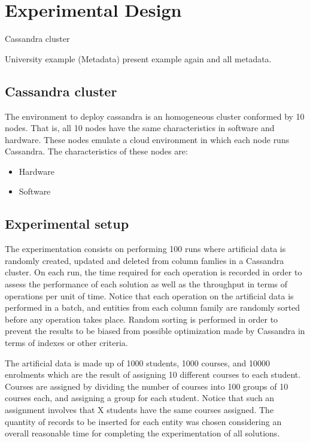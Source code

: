\chapter{Experimental Design}
Cassandra cluster

University example (Metadata) present example again and all metadata.

\section{Cassandra cluster}

The environment to deploy cassandra is  an homogeneous cluster conformed by 10
nodes. That is, all 10 nodes have the same characteristics in software and
hardware. These nodes emulate a cloud environment in which each node runs
Cassandra. The characteristics of these nodes are:

\begin{itemize}
  \item Hardware
  \item Software
\end{itemize}




\section{Experimental setup}\label{s:exp:setup}
The experimentation consists on performing 100 runs where artificial data is
randomly created, updated and deleted from column famlies in a Cassandra
cluster.
On each run, the time required for each operation is recorded in order to assess the
performance of each solution as well as the throughput in terms of operations
per unit of time. Notice that each operation on the artificial data  is
performed in a batch, and entities from each column family are randomly sorted
before any operation takes place. Random sorting is performed in order to
prevent the results to be biased from possible optimization made by Cassandra in
terms of indexes or other criteria.
		
The artificial data is made up of 1000 students, 1000 courses, and 10000
enrolments which are the result of assigning 10 different courses to each
student. Courses are assigned by dividing the number of courses
into 100 groups of 10 courses each, and assigning a group for each student.
Notice that such an assignment involves that X students have the same courses
assigned. The quantity of records to be inserted for each entity was chosen
considering an overall reasonable time for completing the experimentation of all
solutions.
		
